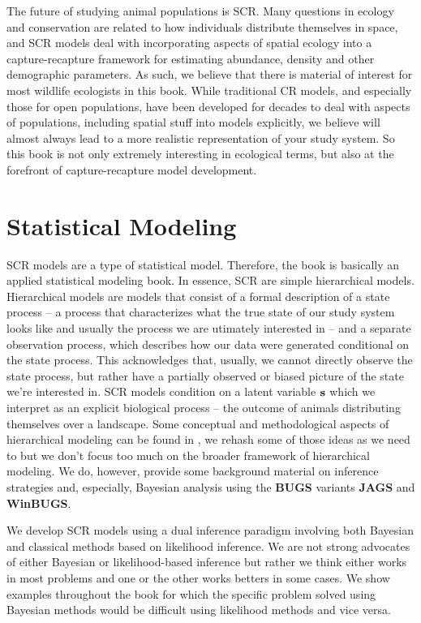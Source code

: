 The future of studying animal populations is SCR. 
 Many questions in ecology and conservation are related to
how individuals distribute themselves in space, and SCR models deal
with incorporating aspects of spatial ecology into a capture-recapture
framework for estimating abundance, density and other demographic
parameters. As such, we believe that there is material of interest for
most wildlife ecologists in this book. While traditional CR models,
and especially those for open populations, have been developed for
decades to deal with aspects of populations, including spatial stuff
into models explicitly, we believe will almost always lead to a more
realistic representation of your study system.  So this book is not
only extremely interesting in ecological terms, but also at the
forefront of capture-recapture model development.


\section*{Statistical Modeling}

SCR models are a type of statistical model. Therefore, the book is
basically an applied statistical modeling book.  In essence, SCR are
simple hierarchical models.  Hierarchical models are models that
consist of a formal description of a state process -- a process that
characterizes what the true state of our study system looks like and
usually the process we are utimately interested in -- and a separate
observation process, which describes how our data were generated
conditional on the state process. This acknowledges that, usually, we
cannot directly observe the state process, but rather have a partially
observed or biased picture of the state we're interested in.  SCR
models condition on a latent variable ${\bf s}$ which we interpret as
an explicit biological process -- the outcome of animals distributing
themselves over a landscape.  Some conceptual and methodological
aspects of hierarchical modeling can be found in
\citet{royle_dorazio:2008}, we rehash some of those ideas as we need
to but we don't focus too much on the broader framework of
hierarchical modeling.  We do, however, provide some background
material on inference strategies and, especially, Bayesian analysis
using the {\bf BUGS} variants {\bf JAGS} and {\bf WinBUGS}.

We develop SCR models using a dual inference paradigm involving both
Bayesian and classical methods based on likelihood inference.
We are not strong advocates of either Bayesian or likelihood-based
inference but rather we think either works in most problems and one or
the other works betters in some cases. 
We show examples throughout the
book for which the specific problem solved using Bayesian methods
would be difficult using likelihood methods and vice versa.



